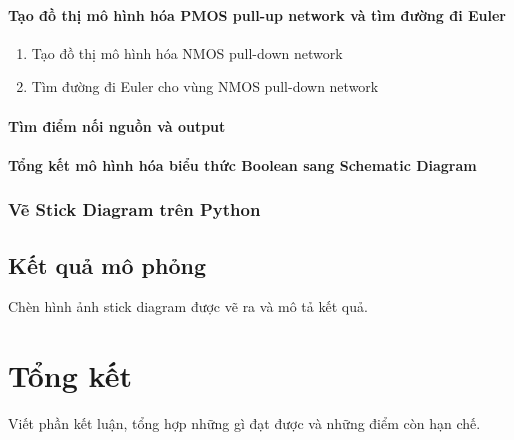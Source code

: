 \documentclass[a4paper,12pt]{article}
\begin{document}
\paragraph{Tạo đồ thị mô hình hóa PMOS pull-up network và tìm đường đi Euler}
\begin{enumerate}[label=\alph*.]
    \item{Tạo đồ thị mô hình hóa NMOS pull-down network}
    \item{Tìm đường đi Euler cho vùng NMOS pull-down network}
\end{enumerate}
\paragraph{Tìm điểm nối nguồn và output}
\paragraph{Tổng kết mô hình hóa biểu thức Boolean sang Schematic Diagram}
\subsubsection{Vẽ Stick Diagram trên Python}
\subsection{Kết quả mô phỏng}
Chèn hình ảnh stick diagram được vẽ ra và mô tả kết quả.
\newpage
\section{Tổng kết}
Viết phần kết luận, tổng hợp những gì đạt được và những điểm còn hạn chế.
\end{document}
